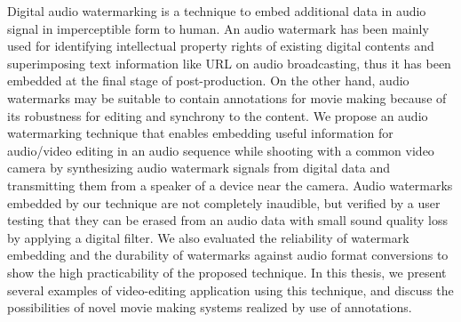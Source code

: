 \begin{eabstract}
Digital audio watermarking is a technique to embed additional data in audio signal in imperceptible form to human.
An audio watermark has been mainly used for identifying intellectual property rights of existing digital contents and superimposing text information like URL on audio broadcasting, thus it has been embedded at the final stage of post-production.
On the other hand, audio watermarks may be suitable to contain annotations for movie making because of its robustness for editing and synchrony to the content.
We propose an audio watermarking technique that enables embedding useful information for audio/video editing in an audio sequence while shooting with a common video camera by synthesizing audio watermark signals from digital data and transmitting them from a speaker of a device near the camera.
Audio watermarks embedded by our technique are not completely inaudible, but verified by a user testing that they can be erased from an audio data with small sound quality loss by applying a digital filter.
We also evaluated the reliability of watermark embedding and the durability of watermarks against audio format conversions to show the high practicability of the proposed technique.
In this thesis, we present several examples of video-editing application using this technique, and discuss the possibilities of novel movie making systems realized by use of annotations.
\end{eabstract}

